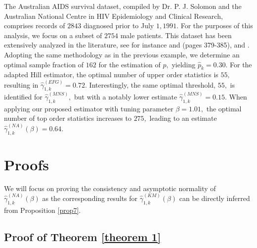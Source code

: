 \documentclass[reqno,openbib,runningheads,a4paper,12pt]{amsart}%
\begin{document}
\noindent The Australian AIDS survival dataset, compiled by Dr. P. J. Solomon
and the Australian National Centre in HIV Epidemiology and Clinical Research,
comprises records of $2843$ diagnosed prior to July $1,1991.$ For the purposes
of this analysis, we focus on a subset of $2754$ male patients. This dataset
has been extensively analyzed in the literature, see for instance \cite{RS-94}
and \cite{VR-02} (pages 379-385), \cite{EnFG08} and \cite{Ndao16}. Adopting
the same methodology as in the previous example, we determine an optimal
sample fraction of $162$ for the estimation of $p,$ yielding $\widehat{p}%
_{k}=0.30.$ For the adapted Hill estimator, the optimal number of upper order
statistics is $55,$ resulting in $\widehat{\gamma}_{1,k}^{\left(  EFG\right)
}=0.72.$ Interestingly, the same optimal threshold, $55,$ is identified for
$\widehat{\gamma}_{1,k}^{\left(  MNS\right)  },$ but with a notably lower
estimate $\widehat{\gamma}_{1,k}^{\left(  MNS\right)  }=0.15.$ When applying
our proposed estimator with tuning parameter $\beta=1.01,$ the optimal number
of top order statistics increases to $275,$ leading to an estimate
$\widehat{\gamma}_{1,k}^{\left(  NA\right)  }\left(  \beta\right)  =0.64.$

\section{\textbf{Proofs\label{sec5}}}

\noindent We will focus on proving the consistency and asymptotic normality of
$\widehat{\gamma}_{1,k}^{\left(  NA\right)  }\left(  \beta\right)  $ as the
corresponding results for $\widehat{\gamma}_{1,k}^{\left(  KM\right)  }\left(
\beta\right)  $ can be directly inferred from Proposition \ref{prop7}.

\subsection{\textbf{Proof }of Theorem \ref{theorem 1}}
\end{document}
